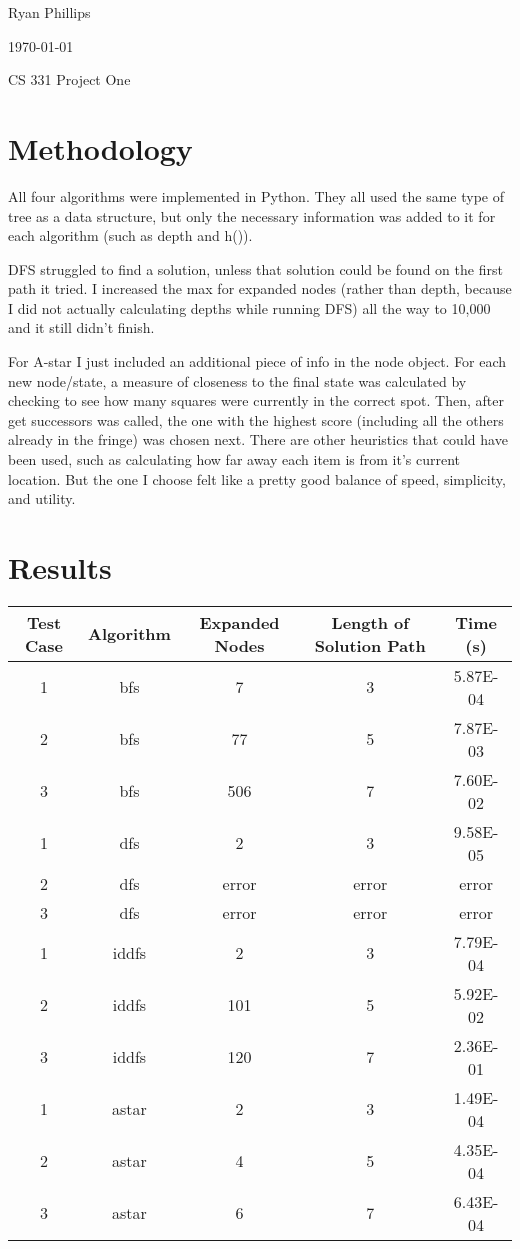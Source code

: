 \documentclass[letterpaper,12pt,titlepage]{article}
\def\name{Ryan Phillips}
\begin{document}
\hfill \name

\hfill \today

\hfill CS 331 Project One

\section*{Methodology} 

All four algorithms were implemented in Python. They all used the same type of tree as a data structure, but only the necessary information was added to it for each algorithm (such as depth and h()). 

DFS struggled to find a solution, unless that solution could be found on the first path it tried. I increased the max for expanded nodes (rather than depth, because I did not actually calculating depths while running DFS) all the way to 10,000 and it still didn't finish.

For A-star I just included an additional piece of info in the node object. For each new node/state, a measure of closeness to the final state was calculated by checking to see how many squares were currently in the correct spot. Then, after get successors was called, the one with the highest score (including all the others already in the fringe) was chosen next. There are other heuristics that could have been used, such as calculating how far away each item is from it's current location. But the one I choose felt like a pretty good balance of speed, simplicity, and utility. 

\section*{Results} 

 \begin{tabular}{c |  c | c | c | c}
Test Case & Algorithm & Expanded Nodes & Length of Solution Path & Time (s) \\
\hline
1 	& bfs & 7 & 3 & 5.87E-04 \\
2	& bfs & 77 & 5 & 7.87E-03 \\
3	& bfs & 506 & 7 & 7.60E-02 \\
1 	& dfs & 2 & 3 & 9.58E-05 \\
2	& dfs & error & error & error \\
3	& dfs & error & error & error \\
1 	& iddfs & 2 & 3 & 7.79E-04 \\
2	& iddfs & 101 & 5 & 5.92E-02 \\
3	& iddfs & 120 & 7 & 2.36E-01 \\
1 	& astar & 2 & 3 & 1.49E-04 \\
2	& astar & 4 & 5 & 4.35E-04 \\
3	& astar & 6 & 7 & 6.43E-04 \\

\end{tabular}
\end{document}
